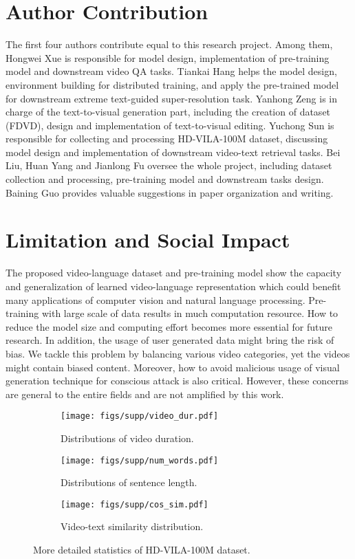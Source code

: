 \section{Author Contribution}
The first four authors contribute equal to this research project. 
Among them, Hongwei Xue is responsible for model design, implementation of pre-training model and downstream video QA tasks. Tiankai Hang helps the model design, environment building for distributed training, and apply the pre-trained model for downstream extreme text-guided super-resolution task. Yanhong Zeng is in charge of the text-to-visual generation part, including the creation of dataset (FDVD), design and implementation of text-to-visual editing. Yuchong Sun is responsible for collecting and processing HD-VILA-100M dataset, discussing model design and implementation of downstream video-text retrieval tasks.
Bei Liu, Huan Yang and Jianlong Fu oversee the whole project, including dataset collection and processing, pre-training model and downstream tasks design. Baining Guo provides valuable suggestions in paper organization and writing. 

\section{Limitation and Social Impact}
The proposed video-language dataset and pre-training model show the capacity and generalization of learned video-language representation which could benefit many applications of computer vision and natural language processing. Pre-training with large scale of data results in much computation resource. How to reduce the model size and computing effort becomes more essential for future research. In addition, the usage of user generated data might bring the risk of bias. We tackle this problem by balancing various video categories, yet the videos might contain biased content. Moreover, how to avoid malicious usage of visual generation technique for conscious attack is also critical. However, these concerns are general to the entire fields and are not amplified by this work.

\begin{figure*}
    \centering
    \begin{subfigure}[b]{0.33\textwidth}
        \centering
        \texttt{[image: figs/supp/video\_dur.pdf]}
        \caption{Distributions of video duration.}
        \label{fig:video_dur}
    \end{subfigure}
    \hfill
    \begin{subfigure}[b]{0.33\textwidth}
        \centering
        \texttt{[image: figs/supp/num\_words.pdf]}
        \caption{Distributions of sentence length.}
        \label{fig:num_words}
    \end{subfigure}
    \hfill
    \begin{subfigure}[b]{0.33\textwidth}
        \centering
        \texttt{[image: figs/supp/cos\_sim.pdf]}
        \caption{Video-text similarity distribution.}
        \label{fig:cos_sim}
    \end{subfigure}
\caption{More detailed statistics of HD-VILA-100M dataset.}
\end{figure*}

